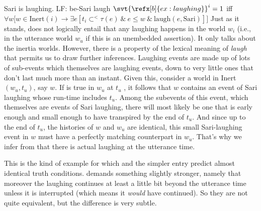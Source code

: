 \pex\label{ex:laughing}
\a Sari is laughing.
\a LF: \lb[TP] \pres \lb[AspP] be-\prog \lb[VP] Sari laugh \rb \rb \rb
\a $\svt{\refx[b]{ex:laughing}}^{i} = 1$ iff\\
$\forall w \bigl[ w \in \text{Inert}(i) \rightarrow \exists e [t_{i} \subset^{<}
\tau(e)\ \&\ e \le w\ \&\ \text{laugh}(e,\text{Sari})]\bigr]$
\xe
%
Just as it stands, \Last[c] does not logically entail that any laughing happens
in the world $w_{i}$ (i.e., in the utterance world $w_{u}$ if this is an
unembedded assertion). It only talks about the inertia worlds. However, there is
a property of the lexical meaning of \emph{laugh} that permits us to draw
further inferences. Laughing events are made up of lots of sub-events which
themselves are laughing events, down to very little ones that don't last much
more than an instant. Given this, consider a world in Inert$(w_{u},t_{u})$, say
$w$. If \Last[b] is true in $w_{u}$ at $t_{u}$ , it follows that $w$ contains an
event of Sari laughing whose run-time includes $t_{u}$. Among the subevents of
this event, which themselves are events of Sari laughing, there will most likely
be one that is early enough and small enough to have transpired by the end of
$t_{u}$. %
%
And since up to the end of $t_{u}$, the histories of $w$ and $w_{u}$ are
identical, this small Sari-laughing event in $w$ must have a perfectly matching
counterpart in $w_{u}$. That's why we infer from \Last[a] that there is actual
laughing at the utterance time.

This is the kind of example for which  and the simpler entry
 predict almost identical truth conditions.
 demands something slightly stronger, namely that moreover
the laughing continues at least a little bit beyond the utterance time unless it
is interrupted (which means it \emph{would} have continued). So they are not
quite equivalent, but the difference is very subtle.

